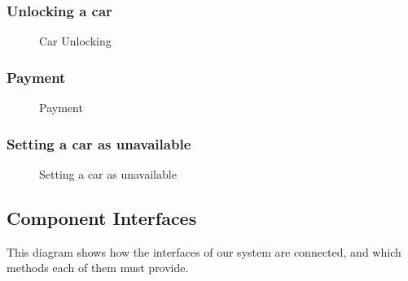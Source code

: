 \documentclass[english]{article}
\begin{document}
\subsubsection{Unlocking a car}
\begin{figure}[H]
	\centering
	\makebox[\textwidth][c]{
		\def\svgwidth{450pt}
		
	}
	\caption{Car Unlocking}
	\label{seq_carunlock}
\end{figure}

\subsubsection{Payment}
\begin{figure}[H]
	\centering
	\makebox[\textwidth][c]{
		\def\svgwidth{450pt}
		
	}
	\caption{Payment}
	\label{seq_payment}
\end{figure}

\subsubsection{Setting a car as unavailable}
\begin{figure}[H]
	\centering
	\makebox[\textwidth][c]{
		\def\svgwidth{450pt}
		
	}
	\caption{Setting a car as unavailable}
	\label{seq_carunavailable}
\end{figure}

\newpage
\subsection{Component Interfaces}

This diagram shows how the interfaces of our system are connected, and which methods each of them must provide.
\end{document}
